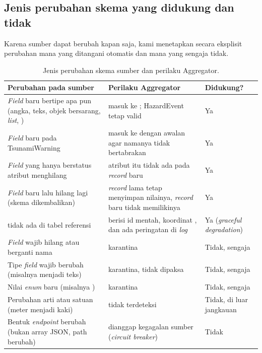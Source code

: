 \subsection{Jenis perubahan skema yang didukung dan tidak}

Karena sumber dapat berubah kapan saja, kami menetapkan secara eksplisit perubahan mana yang ditangani otomatis dan mana
yang sengaja tidak.

\begin{table}[H]
\centering\small
\begin{tabularx}{\textwidth}{@{}Y L{5.6cm} L{2.0cm}@{}}
\toprule
\textbf{Perubahan pada sumber} & \textbf{Perilaku Aggregator} & \textbf{Didukung?}\\
\midrule
\emph{Field} baru bertipe apa pun (angka, teks, objek bersarang, \emph{list}, ) & masuk ke ; HazardEvent tetap valid & Ya\\
\emph{Field} baru pada TsunamiWarning & masuk ke  dengan awalan  agar namanya tidak bertabrakan & Ya\\
\emph{Field} yang hanya berstatus atribut menghilang & atribut itu tidak ada pada \emph{record} baru & Ya\\
\emph{Field} baru lalu hilang lagi (skema dikembalikan) & \emph{record} lama tetap menyimpan nilainya, \emph{record} baru tidak memilikinya & Ya\\
 tidak ada di tabel referensi &  berisi id mentah, koordinat , dan ada peringatan di \emph{log} & Ya (\emph{graceful degradation})\\
\midrule
\emph{Field} wajib hilang atau berganti nama & karantina & Tidak, sengaja\\
Tipe \emph{field} wajib berubah (misalnya  menjadi teks) & karantina, tidak dipaksa & Tidak, sengaja\\
Nilai \emph{enum} baru (misalnya ) & karantina & Tidak, sengaja\\
Perubahan arti atau satuan (meter menjadi kaki) & tidak terdeteksi & Tidak, di luar jangkauan\\
Bentuk \emph{endpoint} berubah (bukan array JSON, path berubah) & dianggap kegagalan sumber (\emph{circuit breaker}) & Tidak\\
\bottomrule
\end{tabularx}
\caption{Jenis perubahan skema sumber dan perilaku Aggregator.}
\end{table}

